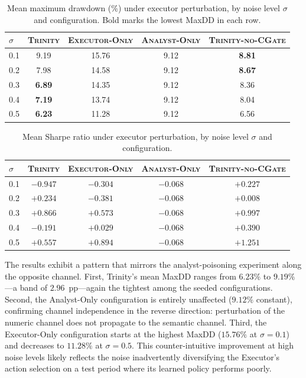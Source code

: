 \begin{table}[h]
\centering
\caption{Mean maximum drawdown (\%) under executor perturbation, by noise
  level $\sigma$ and configuration. Bold marks the lowest MaxDD in each
  row.}
\label{tab:perturb-maxdd}
\begin{tabular}{lcccc}
\toprule
$\sigma$ & \textsc{Trinity} & \textsc{Executor-Only} &
  \textsc{Analyst-Only} & \textsc{Trinity-no-CGate} \\
\midrule
0.1 & 9.19           & 15.76 & 9.12           & \textbf{8.81} \\
0.2 & 7.98           & 14.58 & 9.12           & \textbf{8.67} \\
0.3 & \textbf{6.89}  & 14.35 & 9.12           & 8.36 \\
0.4 & \textbf{7.19}  & 13.74 & 9.12           & 8.04 \\
0.5 & \textbf{6.23}  & 11.28 & 9.12           & 6.56 \\
\bottomrule
\end{tabular}
\end{table}

\begin{table}[h]
\centering
\caption{Mean Sharpe ratio under executor perturbation, by noise level
  $\sigma$ and configuration.}
\label{tab:perturb-sharpe}
\begin{tabular}{lcccc}
\toprule
$\sigma$ & \textsc{Trinity} & \textsc{Executor-Only} &
  \textsc{Analyst-Only} & \textsc{Trinity-no-CGate} \\
\midrule
0.1 & $-0.947$ & $-0.304$ & $-0.068$ & $+0.227$ \\
0.2 & $+0.234$ & $-0.381$ & $-0.068$ & $+0.008$ \\
0.3 & $+0.866$ & $+0.573$ & $-0.068$ & $+0.997$ \\
0.4 & $-0.191$ & $+0.029$ & $-0.068$ & $+0.390$ \\
0.5 & $+0.557$ & $+0.894$ & $-0.068$ & $+1.251$ \\
\bottomrule
\end{tabular}
\end{table}

The results exhibit a pattern that mirrors the analyst-poisoning
experiment along the opposite channel. First, Trinity's mean MaxDD
ranges from $6.23\%$ to $9.19\%$---a band of $2.96$~pp---again the
tightest among the seeded configurations. Second, the Analyst-Only
configuration is entirely unaffected ($9.12\%$ constant), confirming
channel independence in the reverse direction: perturbation of the
numeric channel does not propagate to the semantic channel. Third, the
Executor-Only configuration starts at the highest MaxDD ($15.76\%$ at
$\sigma = 0.1$) and decreases to $11.28\%$ at $\sigma = 0.5$. This
counter-intuitive improvement at high noise levels likely reflects
the noise inadvertently diversifying the Executor's action selection
on a test period where its learned policy performs poorly.

